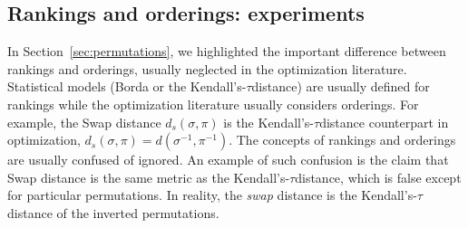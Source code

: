 \documentclass[sigconf,dvipsnames]{acmart}
\newcommand{\supplement}{\href{http://doi.org/10.5281/zenodo.4500974}{doi:~10.5281/zenodo.4500974}}
\newcommand{\ken}{Kendall's-$\tau$}
\begin{document}

\newcommand{\CEGOorig}{CEGO$_\text{ori}$\xspace}
\newcommand{\CEGOinv}{CEGO$_\text{inv}$\xspace}

\subsection{Rankings and orderings: experiments}\label{sec:exper_ro}

In Section~\ref{sec:permutations}, we highlighted the important difference between rankings and orderings, usually neglected in the optimization literature. Statistical models (Borda or the \ken distance) are usually defined for rankings while the optimization literature usually considers orderings. For example, the Swap distance $d_s(\sigma,\pi)$ is the \ken distance counterpart in optimization, $d_s(\sigma,\pi) = d(\sigma^{-1}, \pi^{-1})$. The concepts of rankings and orderings are usually confused of ignored. An example of such confusion is the claim that Swap distance is the same metric as  the \ken distance, which is false except for particular permutations. In reality, the \emph{swap} distance is the \ken distance of the inverted permutations.
\end{document}
